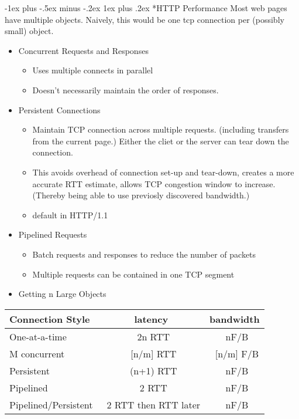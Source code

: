\documentclass[3pt,landscape]{article}
\makeatletter
\renewcommand{\subsubsection}{\@startsection{subsubsection}{3}{0mm}%
                            {-1ex plus -.5ex minus -.2ex}%
                            {1ex plus .2ex}%
                            {\normalfont\small\bfseries}}
\makeatother
\begin{document}
\begin{multicols}{3}
\subsubsection*{HTTP Performance}
Most web pages have multiple objects. Naively, this would be one tcp connection per (possibly small) object.
\begin{itemize}
    \item Concurrent Requests and Responses
        \begin{itemize}
            \item Uses multiple connects in parallel
            \item Doesn't necessarily maintain the order of responses.
        \end{itemize}
    \item Persistent Connections
        \begin{itemize}
            \item Maintain TCP connection across multiple requests. (including transfers from the current page.) Either the cliet or the server can tear down the connection.
            \item This avoids overhead of connection set-up and tear-down, creates a more accurate RTT estimate, allows TCP congestion window to increase. (Thereby being able to use previosly discovered bandwidth.)
            \item default in HTTP/1.1
        \end{itemize}
    \item Pipelined Requests
        \begin{itemize}
            \item Batch requests and responses to reduce the number of packets
            \item Multiple requests can be contained in one TCP segment
        \end{itemize}
    \item Getting n Large Objects
\end{itemize}
\begin{tabular}{|l|c|c|}
    \hline
    Connection Style & latency & bandwidth\\
    \hline
    \hline
    One-at-a-time & ~2n RTT & ~nF/B\\
    M concurrent & ~[n/m] RTT & ~[n/m] F/B\\
    Persistent & ~(n+1) RTT & ~nF/B\\
    Pipelined & ~2 RTT & ~nF/B\\
    Pipelined/Persistent & ~2 RTT then RTT later & ~nF/B\\

\end{tabular}
\end{multicols}
\end{document}
